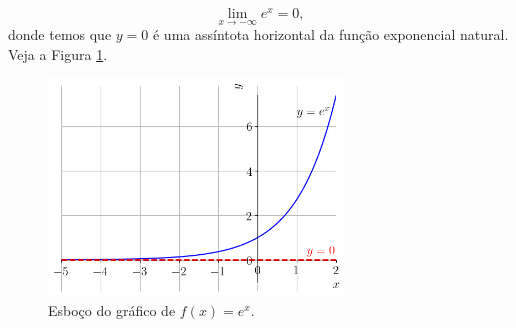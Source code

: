 \begin{ex}\label{ex:lim_exp_x-inf}
  \begin{equation}
    \lim_{x\to -\infty} e^x = 0,
  \end{equation}
  donde temos que $y=0$ é uma assíntota horizontal da função exponencial natural. Veja a Figura \ref{fig:lim_ex_xinf_exp}.

  \begin{figure}[H]
    \centering
    \includegraphics[width=0.7\textwidth]{./cap_lim/dados/fig_ex_xinf_exp/fig_ex_xinf_exp}
    \caption{Esboço do gráfico de $f(x)=e^x$.}
    \label{fig:lim_ex_xinf_exp}
  \end{figure}
\end{ex}

